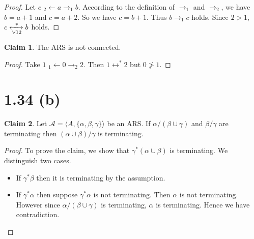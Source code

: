 \documentclass[autodetect-enginem]{article}
\theoremstyle{plain}
\theoremstyle{definition}
\newtheorem*{claim*}{Claim}
\begin{document}
\begin{proof}
    Let $c$ $_2\!\leftarrow a \to_1 b$.
    According to the definition of $\to_1$ and $\to_2$, we have $b = a+1$ and $c = a+2$.
    So we have $c = b+1$. Thus $b \to_1 c$ holds.
    Since $2 > 1$, $c \xleftrightarrow[\vee 12]{*} b$ holds.
\end{proof}

\begin{claim*}
    The ARS is not connected.
\end{claim*}
\begin{proof}
    Take $1$ $_1\!\leftarrow 0 \to_2 2$. Then $1 \leftrightarrow^* 2$ but $0 \ngtr 1$.
\end{proof}

\section*{1.34 (b)}

\begin{claim*}
    Let $\mathcal{A} = \langle A, \{\alpha, \beta, \gamma\} \rangle$ be an ARS.
    If $\alpha/(\beta \cup \gamma)$ and $\beta/\gamma$ are terminating
    then $(\alpha \cup \beta) / \gamma$ is terminating.
\end{claim*}

\begin{proof}
    To prove the claim, we show that $\gamma^*(\alpha \cup \beta)$ is terminating.
    We distinguish two cases.
    \begin{itemize}
        \item If $\gamma^*\beta$ then it is terminating by the assumption.
        \item If $\gamma^*\alpha$ then suppose $\gamma^*\alpha$ is not terminating.
        Then $\alpha$ is not terminating. However since $\alpha/(\beta \cup \gamma)$ is terminating,
        $\alpha$ is terminating. Hence we have contradiction.
    \end{itemize}
\end{proof}
\end{document}
